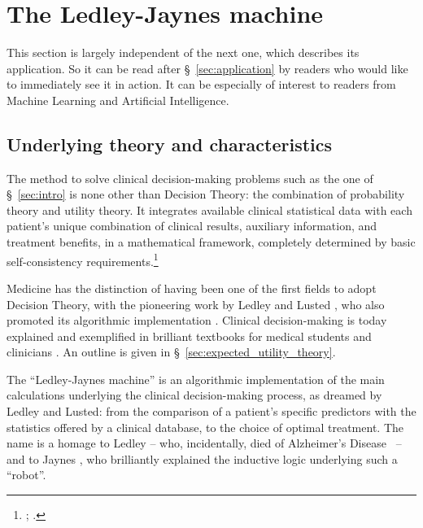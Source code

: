 \documentclass[utf8]{FrontiersinHarvard} %
\newcommand*{\sect}{\S}%
\newcommand*{\chaps}{chs}%
\renewcommand*{\|}[1][]{\nonscript\:#1\vert\nonscript\:\mathopen{}}
\newcommand*{\ad}{Alzheimer's Disease}
\newcommand*{\ljm}{Ledley-Jaynes machine}
\begin{document}
\bigskip%
\section{The \ljm}
\label{sec:the_machine}

This section is largely independent of the next one, which describes its application. So it can be read after \sect~\ref{sec:application}%
by readers who would like to immediately see it in action. It can be especially of interest to readers from Machine Learning and Artificial Intelligence.

\subsection{Underlying theory and characteristics}
\label{sec:the_machine_principles}

The method to solve clinical decision-making problems such as the one of \sect~\ref{sec:intro} %
is none other than Decision Theory: the combination of probability theory and utility theory. It integrates available clinical statistical data with each patient's unique combination of clinical results, auxiliary information, and treatment benefits, in a mathematical framework, completely determined by basic self-consistency requirements.\footnote{\citet[\chaps~13--14]{jaynes1994_r2003}; \citet{vonneumannetal1944_r1955,cox1946,savage1954_r1972,luceetal1957,raiffaetal1961_r2000,raiffa1968_r1970,lindley1971_r1988,kreps1988}.}

Medicine has the distinction of having been one of the first fields to adopt Decision Theory, with the pioneering work by Ledley and Lusted \citeyearpar{ledleyetal1959,ledleyetal1959b,ledleyetal1960,lustedetal1960}, who also promoted its algorithmic implementation \citep[see especially \sect~1-5 p.~21]{ledley1959,ledley1960}. Clinical decision-making is today explained and exemplified in brilliant textbooks for medical students and clinicians \citep{weinsteinetal1980,soxetal1988_r2013,huninketal2001_r2014}. An outline is given in \sect~\ref{sec:expected_utility_theory}.

The \enquote{\ljm} is an algorithmic implementation of the main calculations underlying the clinical decision-making process, as dreamed by Ledley and Lusted: from the comparison of a patient's specific predictors with the statistics offered by a clinical database, to the choice of optimal treatment. The name is a homage to Ledley -- who, incidentally, died of \ad\ \citep{shahetal2013} -- and to Jaynes \citeyearpar{jaynes1994_r2003}, who brilliantly explained the inductive logic underlying such a \enquote{robot}.
\end{document}
